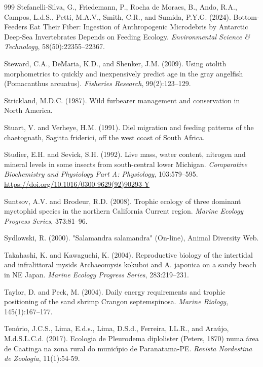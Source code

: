 \begin{thebibliography}{999}
Stefanelli-Silva, G., Friedemann, P., Rocha de Moraes, B., Ando, R.A., Campos, L.d.S., Petti, M.A.V., Smith, C.R., and Sumida, P.Y.G. (2024). Bottom-Feeders Eat Their Fiber: Ingestion of Anthropogenic Microdebris by Antarctic Deep-Sea Invertebrates Depends on Feeding Ecology. \textit{Environmental Science \& Technology}, 58(50):22355--22367.

Steward, C.A., DeMaria, K.D., and Shenker, J.M. (2009). Using otolith morphometrics to quickly and inexpensively predict age in the gray angelfish (Pomacanthus arcuatus). \textit{Fisheries Research}, 99(2):123--129.

Strickland, M.D.C. (1987). Wild furbearer management and conservation in North America.

Stuart, V. and Verheye, H.M. (1991). Diel migration and feeding patterns of the chaetognath, Sagitta friderici, off the west coast of South Africa.

Studier, E.H. and Sevick, S.H. (1992). Live mass, water content, nitrogen and mineral levels in some insects from south-central lower {M}ichigan. \textit{Comparative Biochemistry and Physiology Part A: Physiology}, 103:579--595. \url{https://doi.org/10.1016/0300-9629(92)90293-Y}

Suntsov, A.V. and Brodeur, R.D. (2008). Trophic ecology of three dominant myctophid species in the northern California Current region. \textit{Marine Ecology Progress Series}, 373:81--96.

Sydlowski, R. (2000). "Salamandra salamandra" (On-line), {A}nimal {D}iversity {W}eb.

Takahashi, K. and Kawaguchi, K. (2004). Reproductive biology of the intertidal and infralittoral mysids Archaeomysis kokuboi and A. japonica on a sandy beach in NE Japan. \textit{Marine Ecology Progress Series}, 283:219--231.

Taylor, D. and Peck, M. (2004). Daily energy requirements and trophic positioning of the sand shrimp Crangon septemspinosa. \textit{Marine Biology}, 145(1):167--177.

Ten{\'o}rio, J.C.S., Lima, E.d.s., Lima, D.S.d., Ferreira, I.L.R., and Ara{\'u}jo, M.d.S.L.C.d. (2017). Ecologia de Pleurodema diplolister (Peters, 1870) numa {\'a}rea de Caatinga na zona rural do munic{\'\i}pio de Paranatama-PE. \textit{Revista Nordestina de Zoologia}, 11(1):54-59.


\end{thebibliography}
